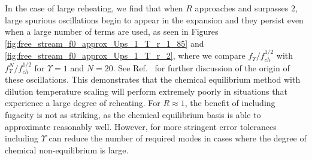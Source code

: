  In the case of large reheating, we find that when $R$ approaches and surpasses $2$, large spurious oscillations begin to appear in the expansion and they persist even when a large number of terms are used, as seen in Figures  \ref{fig:free_stream_f0_approx_Ups_1_T_r_1_85} and \ref{fig:free_stream_f0_approx_Ups_1_T_r_2}, where we compare $f_\Upsilon/f_{ch}^{1/2}$ with $f_{\Upsilon}^N/f_{ch}^{1/2}$ for $\Upsilon=1$ and $N=20$. See Ref.~\cite{Birrell:2014gea} for further discussion of the origin of these oscillations. This demonstrates that the chemical equilibrium method with dilution temperature scaling will  perform extremely poorly in situations that experience a large degree of reheating. For $R\approx 1$, the benefit of including fugacity is not as striking, as the chemical equilibrium basis is able to approximate  reasonably well.  However, for more stringent error tolerances including $\Upsilon$ can reduce the number of required modes in cases where the degree of chemical non-equilibrium is large.
